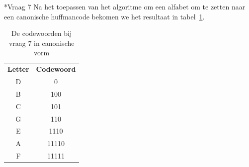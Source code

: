 \documentclass[]{article}
\begin{document}
\begin{section}
    \begin{subsection}*{Vraag 7}
        Na het toepassen van het algoritme om een alfabet om te zetten
        naar een canonische huffmancode bekomen we het resultaat in
        tabel~\ref{tab:canonical_codes}.

        \begin{table}
            \centering
            \begin{tabular}{c|c}
            \textbf{Letter} &
            \textbf{Codewoord} \\
            D & 0 \\
            B & 100 \\
            C & 101 \\
            G & 110 \\
            E & 1110 \\
            A & 11110 \\
            F & 11111 \\
            \end{tabular}
            \caption{De codewoorden bij vraag 7 in canonische vorm}
            \label{tab:canonical_codes}
        \end{table}

    \end{subsection}

\end{section}
\end{document}
